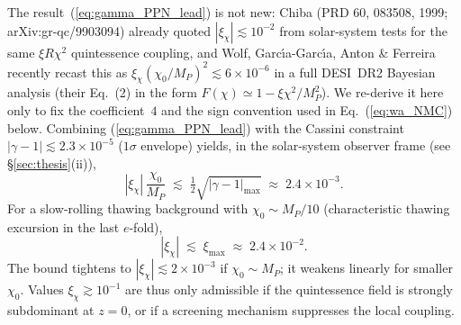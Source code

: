 The result~(\ref{eq:gamma_PPN_lead}) is not new: Chiba (PRD 60, 083508, 1999; arXiv:gr-qc/9903094)
already quoted $|\xi_\chi|\lesssim 10^{-2}$ from solar-system tests for the same $\xi R\chi^{2}$
quintessence coupling, and Wolf, Garc\'{\i}a-Garc\'{\i}a, Anton \& Ferreira~\cite{Wolf2025}
recently recast this as $\xi_\chi(\chi_0/M_P)^{2}\lesssim 6\times 10^{-6}$ in a full DESI~DR2
Bayesian analysis (their Eq.~(2) in the form $F(\chi)\simeq 1-\xi\chi^{2}/M_P^{2}$).
We re-derive it here only to fix the coefficient~$4$ and the sign convention used in
Eq.~(\ref{eq:wa_NMC}) below.
Combining (\ref{eq:gamma_PPN_lead}) with the Cassini constraint~\cite{BertottiIessTortora2003}
$|\gamma-1|\lesssim 2.3\times 10^{-5}$ ($1\sigma$ envelope) yields, in the
solar-system observer frame (see \S\ref{sec:thesis}(ii)),
\begin{equation}
  |\xi_\chi|\,\frac{\chi_0}{M_P}\;\lesssim\;
  \tfrac12\sqrt{|\gamma-1|_{\max}}
  \;\approx\; 2.4\times 10^{-3}.
  \label{eq:xi_bound}
\end{equation}
For a slow-rolling thawing background with $\chi_0\!\sim\! M_P/10$ (characteristic thawing
excursion in the last $e$-fold),
\begin{equation}
  |\xi_\chi|\;\lesssim\;\xi_{\max}\;\approx\;2.4\times 10^{-2}.
  \label{eq:xi_max_numeric}
\end{equation}
The bound tightens to $|\xi_\chi|\lesssim 2\times 10^{-3}$ if $\chi_0\sim M_P$; it weakens
linearly for smaller $\chi_0$. Values $\xi_\chi\gtrsim 10^{-1}$ are thus only admissible if the
quintessence field is strongly subdominant at $z=0$, or if a screening mechanism suppresses the
local coupling.

